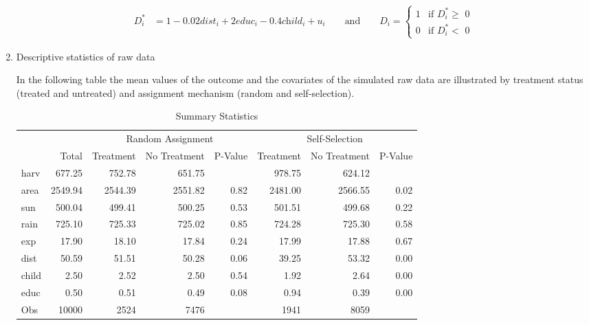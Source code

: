 \begin{enumerate}

\begin{align}
	\label{eq:eq6}
	\textit{D}_i^\ast &= 1 - 0.02 \textit{dist}_i + 2 \textit{educ}_i -  0.4 \textit{child}_i + \textit{u}_i 
	\qquad \text{and}  \qquad  
	\textit{D}_i =
    \begin{cases}
      1 & \text{if $\textit{D}_i^\ast \geq$ 0}\\
      0 & \text{if $\textit{D}_i^\ast <$ 0}
    \end{cases} 
\end{align}



\item Descriptive statistics of raw data

In the following table the mean values of the outcome and the covariates of the simulated raw data are illustrated by treatment status (treated and untreated) and assignment mechanism (random and self-selection). %


\begin{table}[h!]
\centering
\begin{threeparttable}
\caption{Summary Statistics} \label{tab:data}
\begin{tabular}{lrrrrrrr}
  \hline
  & &\multicolumn{3}{c}{Random Assignment} & \multicolumn{3}{c}{Self-Selection}\\
 & Total & Treatment & No Treatment & P-Value & Treatment & No Treatment & P-Value\\
 \hline
harv & 677.25 & 752.78 & 651.75 &  & 978.75 & 624.12 &  \\ 
  area & 2549.94 & 2544.39 & 2551.82 & 0.82 & 2481.00 & 2566.55 & 0.02 \\ 
  sun & 500.04 & 499.41 & 500.25 & 0.53 & 501.51 & 499.68 & 0.22 \\ 
  rain & 725.10 & 725.33 & 725.02 & 0.85 & 724.28 & 725.30 & 0.58 \\ 
  exp & 17.90 & 18.10 & 17.84 & 0.24 & 17.99 & 17.88 & 0.67 \\ 
  dist & 50.59 & 51.51 & 50.28 & 0.06 & 39.25 & 53.32 & 0.00 \\ 
  child & 2.50 & 2.52 & 2.50 & 0.54 & 1.92 & 2.64 & 0.00 \\ 
  educ & 0.50 & 0.51 & 0.49 & 0.08 & 0.94 & 0.39 & 0.00 \\ 
  Obs & 10000 & 2524 & 7476 &  & 1941 & 8059 &  \\ 
   \hline
\end{tabular}
\end{threeparttable}
\end{table}


\end{enumerate}
